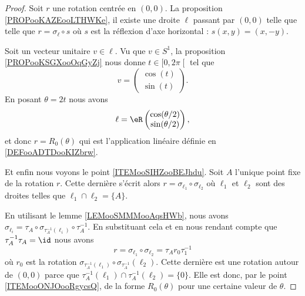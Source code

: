 \begin{proof}
    Soit \( r\) une rotation centrée en \( (0,0)\). La proposition \ref{PROPooKAZEooLTHWKe}, il existe une droite \( \ell\) passant par \( (0,0)\) telle que telle que \( r=\sigma_{\ell}\circ s\) où \( s\) est la réflexion d'axe horizontal : \( s(x,y)=(x,-y)\).

    Soit un vecteur unitaire \( v\in \ell\). Vu que \( v\in S^1\), la proposition \ref{PROPooKSGXooOqGyZj} nous donne \( t\in \mathopen[ 0 ,2\pi  \mathclose[\) tel que
        \begin{equation}
            v=\begin{pmatrix}
                \cos(t)    \\ 
                \sin(t)    
            \end{pmatrix}.
        \end{equation}
        En posant \( \theta=2 t\) nous avons
        \begin{equation}
            \ell=\eR\begin{pmatrix}
                \cos(\theta/2)    \\ 
                \sin(\theta/2)    
            \end{pmatrix},
        \end{equation}
        et donc \( r=R_0(\theta)\) qui est l'application linéaire définie en \ref{DEFooADTDooKIZbrw}.

    Et enfin nous voyons le point \ref{ITEMooSIHZooBEJhdu}. Soit \( A\) l'unique point fixe de la rotation \( r\). Cette dernière s'écrit alors \( r=\sigma_{\ell_1}\circ\sigma_{\ell_2}\) où \( \ell_1\) et \( \ell_2\) sont des droites telles que \( \ell_1\cap\ell_2=\{ A \}\).

    En utilisant le lemme \ref{LEMooSMMMooAqsHWb}, nous avons \( \sigma_{\ell_i}=\tau_A\circ \sigma_{\tau_A^{-1}(\ell_i)}\circ \tau_A^{-1}\). En substituant cela et en nous rendant compte que \( \tau_A^{-1}\tau_A=\id\) nous avons
    \begin{equation}
        r=\sigma_{\ell_1}\circ\sigma_{\ell_2}=\tau_A r_0\tau_1^{-1}
    \end{equation}
    où \( r_0\) est la rotation \( \sigma_{\tau_A^{-1}(\ell_1)}\circ \sigma_{\tau_A^{-1}}(\ell_2)\). Cette dernière est une rotation autour de \( (0,0)\) parce que \( \tau_A^{-1}(\ell_1)\cap \tau_A^{-1}(\ell_2)=\{ 0 \}\). Elle est donc, par le point \ref{ITEMooONJOooRgycsQ}, de la forme \( R_0(\theta)\) pour une certaine valeur de \( \theta\).

\end{proof}

